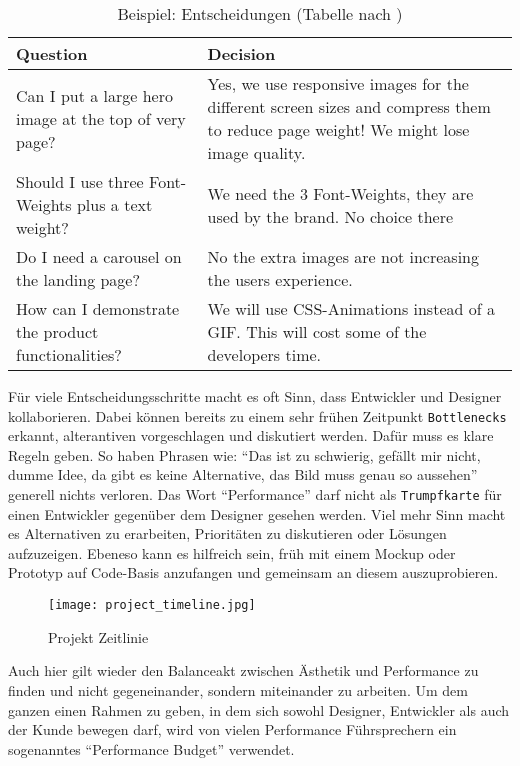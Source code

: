 			\begin{longtable}{|>{\raggedright \arraybackslash}p{7.6cm}|>{\raggedright \arraybackslash}p{7.6cm}|}
			\caption{Beispiel: Entscheidungen (Tabelle nach \autocite[p. 127]{laraHogan14})}\\
				\hline
				\textbf{Question} & \textbf{Decision}\\
				\hline
				Can I put a large hero image at the top of very page? & Yes, we use responsive images for the different screen sizes and compress them to reduce page weight! We might lose image quality.\\
				\hline
				Should I use three Font-Weights plus a text weight? & We need the 3 Font-Weights, they are used by the brand. No choice there\\
				\hline
				Do I need a carousel on the landing page? & No the extra images are not increasing the users experience.\\
				\hline
				How can I demonstrate the product functionalities? & We will use CSS-Animations instead of a GIF. This will cost some of the developers time.\\
				\hline	
			\end{longtable}

			Für viele Entscheidungsschritte macht es oft Sinn, dass Entwickler und Designer kollaborieren. Dabei können bereits zu einem sehr frühen Zeitpunkt \texttt{Bottlenecks} erkannt, alterantiven vorgeschlagen und diskutiert werden. Dafür muss es klare Regeln geben. So haben Phrasen wie: "`Das ist zu schwierig, gefällt mir nicht, dumme Idee, da gibt es keine Alternative, das Bild muss genau so aussehen"' generell nichts verloren. Das Wort "`Performance"' darf nicht als \texttt{Trumpfkarte} für einen Entwickler gegenüber dem Designer gesehen werden. Viel mehr Sinn macht es Alternativen zu erarbeiten, Prioritäten zu diskutieren oder Lösungen aufzuzeigen. Ebeneso kann es hilfreich sein, früh mit einem Mockup oder Prototyp auf Code-Basis anzufangen und gemeinsam an diesem auszuprobieren.

			\begin{figure}[htbp]
				\texttt{[image: project\_timeline.jpg]}
				\caption{Projekt Zeitlinie}
				\label{fig:project_timeline}
			\end{figure}
			
			Auch hier gilt wieder den Balanceakt zwischen Ästhetik und Performance zu finden und nicht gegeneinander, sondern miteinander zu arbeiten. Um dem ganzen einen Rahmen zu geben, in dem sich sowohl Designer, Entwickler als auch der Kunde bewegen darf, wird von vielen Performance Führsprechern ein sogenanntes "`Performance Budget"' verwendet.
		
